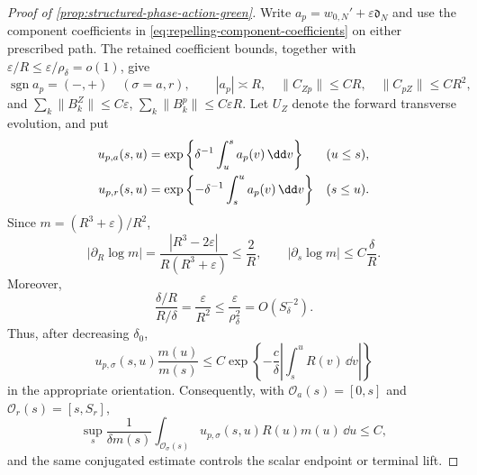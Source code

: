 \begin{proof}[Proof of
\cref{prop:structured-phase-action-green}]
Write \(a_p=w_{0,N}'+\varepsilon\mathfrak d_N\) and use the component
coefficients in \cref{eq:repelling-component-coefficients} on either
prescribed path.  The retained coefficient bounds, together with
\(\varepsilon/R\le\varepsilon/\rho_\delta=o(1)\), give
\begin{equation}
 \operatorname{sgn}a_p=(-,+)\quad(\sigma=a,r),\qquad
 |a_p|\asymp R,\quad \|C_{Zp}\|\le CR,\quad
 \|C_{pZ}\|\le CR^2,                               \label{eq:phase-action-component-sizes}
\end{equation}
and
\(\sum_k\|B_k^Z\|\le C\varepsilon\),
\(\sum_k\|B_k^p\|\le C\varepsilon R\).
Let \(U_Z\) denote the forward transverse evolution, and put
\begin{align}
 u_{p,a}(s,u)
 &=\exp\left\{\delta^{-1}\int_u^s a_p(v)\,\dd v\right\}
       &&(u\le s),\notag\\
 u_{p,r}(s,u)
 &=\exp\left\{-\delta^{-1}\int_s^u a_p(v)\,\dd v\right\}
       &&(s\le u).                                  \label{eq:phase-action-oriented-scalar-kernels}
\end{align}
Since \(m=(R^3+\varepsilon)/R^2\),
\begin{equation}
 |\partial_R\log m|
 =\frac{|R^3-2\varepsilon|}{R(R^3+\varepsilon)}
 \le\frac2R,\qquad
 |\partial_s\log m|\le C\frac\delta R.             \label{eq:phase-action-log-weight}
\end{equation}
Moreover,
\begin{equation}
 \frac{\delta/R}{R/\delta}
 =\frac{\varepsilon}{R^2}
 \le\frac{\varepsilon}{\rho_\delta^2}
 =O(S_\delta^{-2}).                                \label{eq:phase-action-weight-absorption}
\end{equation}
Thus, after decreasing \(\delta_0\),
\begin{equation}
 u_{p,\sigma}(s,u)\frac{m(u)}{m(s)}
 \le C\exp\left\{-\frac c\delta
      \left|\int_s^uR(v)\,\dd v\right|\right\}      \label{eq:phase-action-conjugated-scalar-kernel}
\end{equation}
in the appropriate orientation.  Consequently, with
\(\mathcal O_a(s)=[0,s]\) and \(\mathcal O_r(s)=[s,S_r]\),
\begin{equation}
 \sup_s\frac1{\delta m(s)}
   \int_{\mathcal O_\sigma(s)}
    u_{p,\sigma}(s,u)R(u)m(u)\,\dd u\le C,          \label{eq:phase-action-scalar-convolution}
\end{equation}
and the same conjugated estimate controls the scalar endpoint or terminal
lift.


\end{proof}
